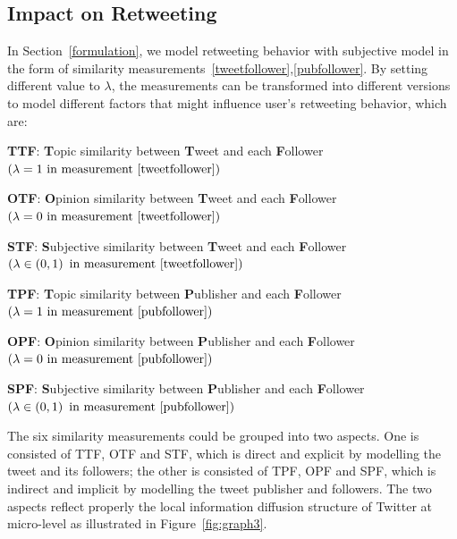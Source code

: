 \documentclass{acm_proc_article-sp}
\begin{document}
\subsection{Impact on Retweeting}
\label{influence}
In Section~\ref{formulation},  we model retweeting behavior with subjective model in the form of similarity measurements~\ref{tweetfollower},\ref{pubfollower}.
By setting different value to $ \lambda $, the measurements can be transformed into different versions to model different factors that might influence user's retweeting behavior, which are:
\begin{itemize*}
\item \textbf{TTF}: \textbf{T}opic similarity between \textbf{T}weet and each \textbf{F}ollower $ \left( \lambda =1  \text{ in measurement~\ref{tweetfollower}} \right) $ 
\item \textbf{OTF}: \textbf{O}pinion similarity between \textbf{T}weet and each \textbf{F}ollower $ \left( \lambda =0 \text{ in measurement~\ref{tweetfollower}} \right) $
\item \textbf{STF}: \textbf{S}ubjective similarity between \textbf{T}weet and each \textbf{F}ollower $ \left( \lambda \in \left( 0,1 \right)   \text{ in measurement~\ref{tweetfollower}} \right) $ 
\item \textbf{TPF}: \textbf{T}opic similarity between \textbf{P}ublisher and each \textbf{F}ollower $ \left( \lambda =1  \text{ in measurement~\ref{pubfollower}}  \right) $ 
\item \textbf{OPF}: \textbf{O}pinion similarity between \textbf{P}ublisher and each \textbf{F}ollower $ \left( \lambda =0 \text{ in measurement~\ref{pubfollower}} \right) $
\item \textbf{SPF}: \textbf{S}ubjective similarity between \textbf{P}ublisher and each \textbf{F}ollower $ \left( \lambda \in \left( 0,1 \right)   \text{ in measurement~\ref{pubfollower}} \right) $
\end{itemize*}
The six similarity measurements could be grouped into two aspects. 
One is consisted of TTF, OTF and STF, which is direct and explicit by modelling the tweet and its followers;
the other is consisted of TPF, OPF and SPF, which is indirect and implicit by modelling the tweet publisher and followers.
The two aspects reflect properly the local information diffusion structure of Twitter at micro-level as illustrated in Figure~\ref{fig:graph3}.
\end{document}
